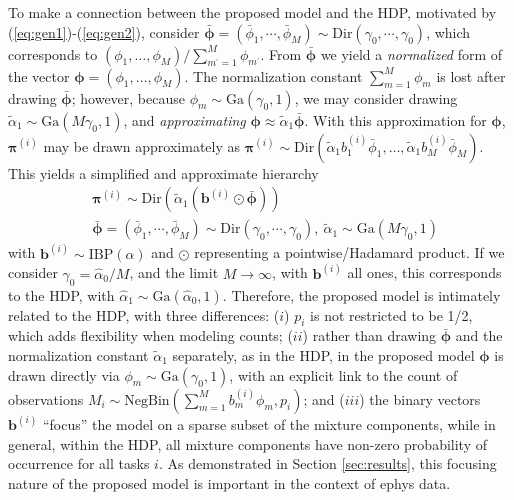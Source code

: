 \documentclass[journal]{IEEEtran}
\newcommand{\beqs}{\begin{eqnarray}}
\newcommand{\eeqs}{\end{eqnarray}}
\newcommand{\bv}{\boldsymbol{b}}
\newcommand{\Omegamat}{\boldsymbol{\Omega}}
\newcommand{\muv}{\boldsymbol{\mu}}
\newcommand{\piv}{\boldsymbol{\pi}}
\newcommand{\phiv}{\boldsymbol{\phi}}
\begin{document}

To make a connection between the proposed model and the HDP, motivated by (\ref{eq:gen1})-(\ref{eq:gen2}), consider $\bar{\phiv}=(\bar{\phi}_1,\cdots,\bar{\phi}_M) \sim \mbox{Dir}(\gamma_0,\cdots,\gamma_0)$, which corresponds to $(\phi_1,\dots,\phi_M)/\sum_{m^\prime=1}^M \phi_{m^\prime}$. From $\bar{\phiv}$ we yield a \emph{normalized} form of the vector $\phiv=(\phi_1,\dots,\phi_M)$. The normalization constant $\sum_{m=1}^M\phi_m$ is lost after drawing $\bar{\phiv}$; however, because $\phi_m\sim\mbox{Ga}(\gamma_0,1)$, we may consider drawing $\tilde{\alpha}_1\sim\mbox{Ga}(M\gamma_0,1)$, and \emph{approximating} ${\phiv}\approx\tilde{\alpha}_1\bar{\phiv}$. With this approximation for $\phiv$, $\piv^{(i)}$ may be drawn approximately as $\piv^{(i)}\sim\mbox{Dir}(\tilde{\alpha}_1b_1^{(i)}\bar{\phi}_1,\dots,\tilde{\alpha}_1b_M^{(i)}\bar{\phi}_M)$. This yields a simplified and approximate hierarchy
\beqs & \piv^{(i)}\sim\mbox{Dir}(\tilde{\alpha}_1(\bv^{(i)}\odot\bar{\phiv}))\\ &\bar{\phiv}=(\bar{\phi}_1,\cdots,\bar{\phi}_M) \sim \mbox{Dir}(\gamma_0,\cdots,\gamma_0),~\tilde{\alpha}_1\sim\mbox{Ga}(M\gamma_0,1)\nonumber\eeqs
with $\bv^{(i)}\sim\mbox{IBP}(\alpha)$ and $\odot$ representing a pointwise/Hadamard product. If we consider $\gamma_0=\hat{\alpha}_0/M$, and the limit $M\rightarrow\infty$, with $\bv^{(i)}$ all ones, this corresponds to the HDP, with $\hat{\alpha}_1\sim\mbox{Ga}(\hat{\alpha}_0,1)$. Therefore, the proposed model is intimately related to the HDP, with three differences: ($i$) $p_i$ is not restricted to be 1/2, which adds flexibility when modeling counts; ($ii$) rather than drawing $\bar{\phiv}$ and the normalization constant $\tilde{\alpha}_1$ separately, as in the HDP, in the proposed model $\phiv$ is drawn directly via $\phi_m\sim\mbox{Ga}(\gamma_0,1)$, with an explicit link to the count of observations $M_i\sim\mbox{NegBin}(\sum_{m=1}^Mb_m^{(i)}\phi_m,p_i)$; and ($iii$) the binary vectors $\bv^{(i)}$ ``focus'' the model on a sparse subset of the mixture components, while in general, within the HDP, all mixture components have non-zero probability of occurrence for all tasks $i$. As demonstrated in Section \ref{sec:results}, this focusing nature of the proposed model is important in the context of ephys data.
\end{document}
